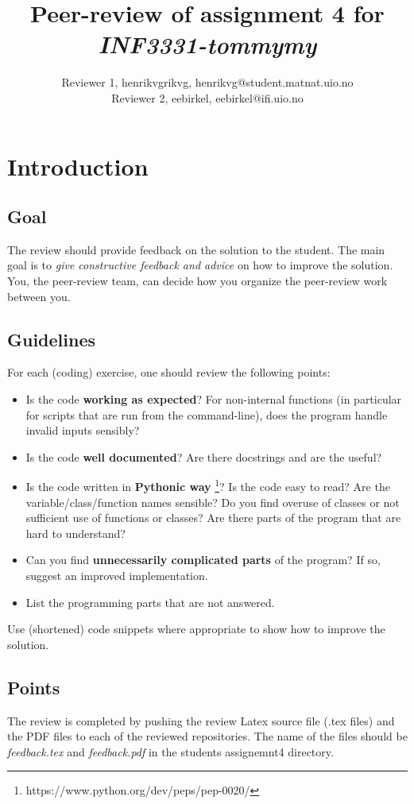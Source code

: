 \documentclass[a4paper]{article}
\title{Peer-review of assignment 4 for \textit{INF3331-tommymy}}
\author{Reviewer 1, henrikvgrikvg, {henrikvg@student.matnat.uio.no} \\
 		Reviewer 2, eebirkel, {eebirkel@ifi.uio.no} }
\begin{document}
\maketitle

\section{Introduction}
\subsection{Goal}
The review should provide feedback on the solution to the student. The main goal is to \emph{give constructive feedback and advice} on how to improve the solution. You, the peer-review team, can decide how you organize the peer-review work between you. 

\subsection{Guidelines}\label{sec:general_review}
For each (coding) exercise, one should review the following points:

\begin{itemize}
  \item Is the code \textbf{working as expected}? For non-internal functions (in particular for scripts that are run from the command-line), does the program handle invalid inputs sensibly?
  \item Is the code \textbf{well documented}? Are there docstrings and are the useful?
  \item Is the code written in \textbf{Pythonic way} \footnote{https://www.python.org/dev/peps/pep-0020/}? Is the code easy to read? Are the variable/class/function names sensible? Do you find overuse of classes or not sufficient use of functions or classes? Are there parts of the program that are hard to understand? 
  \item Can you find \textbf{unnecessarily complicated parts} of the program? If so, suggest an improved implementation.
  \item List the programming parts that are not answered.
\end{itemize}
Use (shortened) code snippets where appropriate to show how to improve the solution. 

\subsection{Points}
The review is completed by pushing the review Latex source file (.tex files) and the PDF files to each of the reviewed repositories. The name of the files should be \emph{feedback.tex} and \emph{feedback.pdf} in the students assignemnt4 directory.
\end{document}
